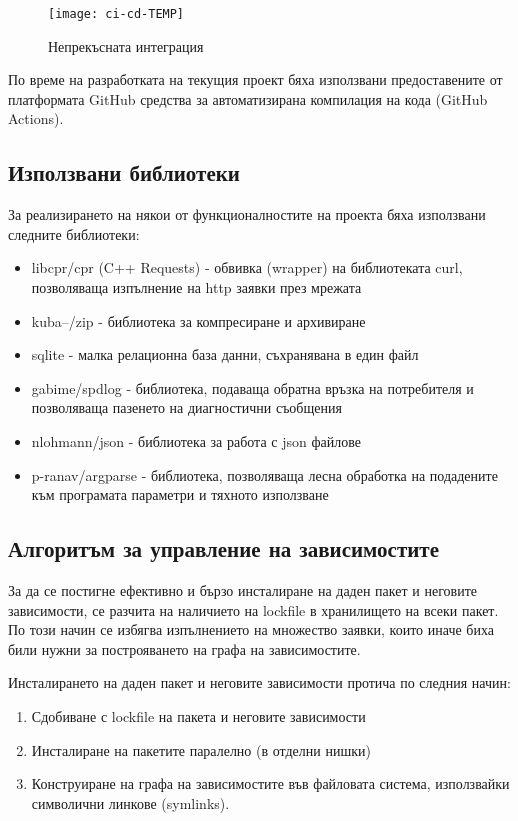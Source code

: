 \begin{figure}[h]
    \centering
    \texttt{[image: ci-cd-TEMP]}
    \caption{Непрекъсната интеграция}
    \label{fig:ci}
\end{figure}

По време на разработката на текущия проект бяха използвани предоставените от
платформата GitHub средства за автоматизирана компилация на кода (GitHub
Actions).


\subsection{Използвани библиотеки}

За реализирането на някои от функционалностите на проекта бяха използвани
следните библиотеки:

\begin{itemize}
    \item libcpr/cpr (C++ Requests) - обвивка (wrapper) на библиотеката curl,
          позволяваща изпълнение на \acrshort{http} заявки през мрежата
    \item kuba--/zip - библиотека за компресиране и архивиране
    \item sqlite - малка релационна база данни, съхранявана в един файл
    \item gabime/spdlog - библиотека, подаваща обратна връзка на потребителя и
          позволяваща пазенето на диагностични съобщения
    \item nlohmann/json - библиотека за работа с \acrshort{json} файлове
    \item p-ranav/argparse - библиотека, позволяваща лесна обработка на подадените към
          програмата параметри и тяхното използване
\end{itemize}


\subsection{Алгоритъм за управление на зависимостите}

За да се постигне ефективно и бързо инсталиране на даден пакет и неговите
зависимости, се разчита на наличието на lockfile в хранилището на всеки пакет.
По този начин се избягва изпълнението на множество заявки, които иначе биха били
нужни за построяването на графа на зависимостите.

Инсталирането на даден пакет и неговите зависимости протича по следния начин:

\begin{enumerate}
    \item Сдобиване с lockfile на пакета и неговите зависимости
    \item Инсталиране на пакетите паралелно (в отделни нишки)
    \item Конструиране на графа на зависимостите във файловата система,
          използвайки символични линкове (symlinks).
\end{enumerate}

